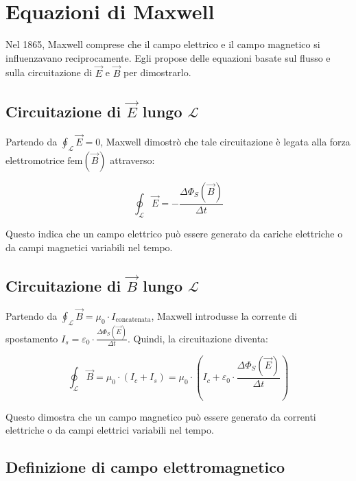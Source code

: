 
\section{Equazioni di Maxwell}

Nel 1865, Maxwell comprese che il campo elettrico e il campo magnetico si influenzavano reciprocamente.
Egli propose delle equazioni basate sul flusso e sulla circuitazione di $\vec{E}$ e $\vec{B}$ per dimostrarlo.

\subsection{Circuitazione di $\vec{E}$ lungo $\mathcal{L}$}

Partendo da $\oint_{\mathcal{L}} \vec{E} = 0$, Maxwell dimostrò che tale circuitazione è legata alla forza elettromotrice $\text{fem}(\vec{B})$ attraverso:

\begin{equation*}
    \oint_{\mathcal{L}} \vec{E} = - \frac{\Delta \Phi_S(\vec{B})}{\Delta t}
\end{equation*}

Questo indica che un campo elettrico può essere generato da cariche elettriche o da campi magnetici variabili nel tempo.

\subsection{Circuitazione di $\vec{B}$ lungo $\mathcal{L}$}

Partendo da $\oint_{\mathcal{L}} \vec{B} = \mu_0 \cdot I_{\text{concatenata}}$, Maxwell introdusse la corrente di spostamento $I_s = \varepsilon_0 \cdot \frac{\Delta \Phi_S(\vec{E})}{\Delta t}$.
Quindi, la circuitazione diventa:

\begin{equation*}
    \oint_{\mathcal{L}} \vec{B} = \mu_0 \cdot \left( I_c + I_s \right) = \mu_0 \cdot \left( I_c + \varepsilon_0 \cdot \frac{\Delta \Phi_S(\vec{E})}{\Delta t} \right)
\end{equation*}

Questo dimostra che un campo magnetico può essere generato da correnti elettriche o da campi elettrici variabili nel tempo.

\subsection{Definizione di campo elettromagnetico}

